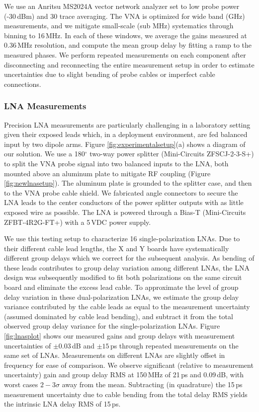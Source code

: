 We use an Anritsu MS2024A vector network analyzer set to low probe power (-30\,dBm) and 30 trace averaging. The VNA is optimized for wide band (GHz) measurements, and we mitigate small-scale (sub MHz) systematics through binning to 16\,MHz. In each of these windows, we average the gains measured at 0.36\,MHz resolution, and compute the mean group delay by fitting a ramp to the measured phases. We perform repeated measurements on each component after disconnecting and reconnecting the entire measurement setup in order to estimate uncertainties due to slight bending of probe cables or imperfect cable connections.

\subsubsection{LNA Measurements}
\label{sec:lnameasurements}

Precision LNA measurements are particularly challenging in a laboratory setting given their exposed leads which, in a deployment environment, are fed balanced input by two dipole arms. Figure \ref{fig:experimentalsetup}(a) shows a diagram of our solution. We use a 180$^\circ$ two-way power splitter (Mini-Circuits ZFSCJ-2-3-S+) to split the VNA probe signal into two balanced inputs to the LNA, both mounted above an aluminum plate to mitigate RF coupling (Figure \ref{fig:newlnasetup}). The aluminum plate is grounded  to the splitter case, and then to the VNA probe cable shield. We fabricated angle connectors to secure the LNA leads to the center conductors of the power splitter outputs with as little exposed wire as possible. The LNA is powered through a Bias-T (Mini-Circuits ZFBT-4R2G-FT+) with a 5\,VDC power supply. 

We use this testing setup to characterize 16 single-polarization LNAs. Due to their different cable lead lengths, the X and Y boards have systematically different group delays which we correct for the subsequent analysis. As bending of these leads contributes to group delay variation among different LNAs, the LNA design was subsequently modified to fit both polarizations  on the same circuit board and eliminate the excess lead cable. To approximate the level of group delay variation in these dual-polarization LNAs, we estimate the group delay variance contributed by the cable leads as equal to the measurement uncertainty (assumed dominated by cable lead bending), and subtract it from the total observed group delay variance for the single-polarization LNAs. Figure \ref{fig:lnasplot} shows our measured gains and group delays with measurement uncertainties of $\pm0.03$\,dB and $\pm15$\,ps through repeated measurements on the same set of LNAs. Measurements on different LNAs are slightly offset in frequency for ease of comparison. We observe significant (relative to measurement uncertainty) gain and group delay RMS at 150\,MHz of 21\,ps and 0.09\,dB, with worst cases $2-3\sigma$ away from the mean. Subtracting (in quadrature) the 15\,ps measurement uncertainty due to cable bending from the total delay RMS yields the intrinsic LNA delay RMS of 15\,ps.

